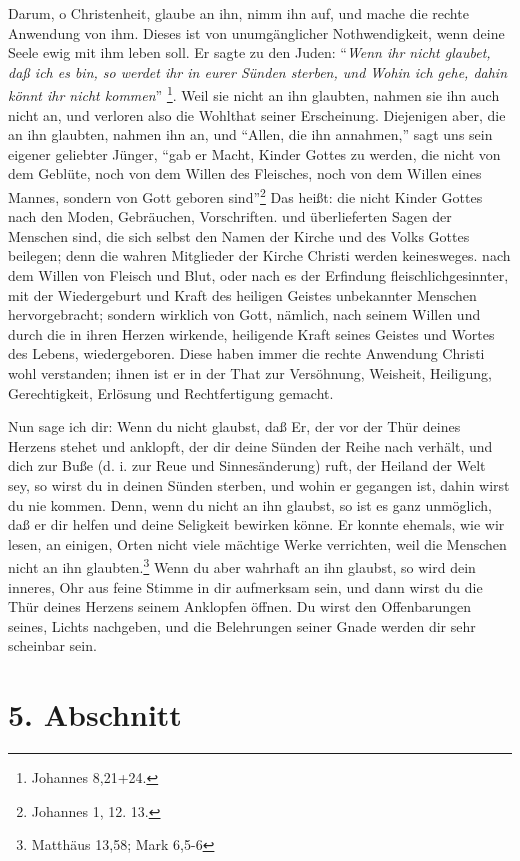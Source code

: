 Darum, o Christenheit, glaube an ihn, nimm ihn auf, und mache die rechte
Anwendung von ihm. Dieses ist von unumgänglicher Nothwendigkeit, wenn deine
Seele ewig mit ihm leben soll.
Er sagte zu den Juden: "`\textit{Wenn ihr nicht glaubet,
daß ich es bin, so werdet ihr in eurer Sünden sterben, und Wohin ich gehe, dahin
könnt ihr nicht kommen}"' \footnote{Johannes 8,21+24.}.
Weil sie nicht an ihn
glaubten, nahmen sie ihn auch nicht an, und verloren also die Wohlthat seiner
Erscheinung. Diejenigen aber, die an ihn glaubten, nahmen ihn an, und "`Allen,
die ihn annahmen,"' sagt uns sein eigener geliebter Jünger, "`gab er Macht,
Kinder Gottes zu werden, die nicht von dem Geblüte, noch von dem Willen des
Fleisches, noch von dem Willen eines Mannes, sondern von Gott geboren
sind"'\footnote{Johannes 1, 12. 13.}  Das heißt: die nicht Kinder Gottes nach den
Moden, Gebräuchen, Vorschriften. und überlieferten Sagen der Menschen sind, die
sich selbst den Namen der Kirche und des Volks Gottes beilegen; denn die wahren
Mitglieder der Kirche Christi werden keinesweges. nach dem Willen von Fleisch
und Blut, oder nach es der Erfindung fleischlichgesinnter, mit der Wiedergeburt
und Kraft des heiligen Geistes unbekannter Menschen hervorgebracht; sondern
wirklich von Gott, nämlich, nach seinem Willen und  durch die in ihren Herzen
wirkende, heiligende Kraft seines Geistes und Wortes des Lebens, wiedergeboren.
Diese haben immer die rechte Anwendung Christi wohl verstanden; ihnen ist er in
der That zur Versöhnung, Weisheit, Heiligung, Gerechtigkeit, Erlösung und
Rechtfertigung gemacht.

Nun sage ich dir: Wenn du nicht glaubst, daß Er, der vor der Thür deines Herzens
stehet und anklopft, der dir deine Sünden der Reihe nach verhält, und dich zur
Buße (d. i. zur Reue und Sinnesänderung) ruft, der Heiland der Welt sey, so
wirst du in deinen Sünden sterben, und wohin er gegangen ist, dahin wirst du nie
kommen. Denn, wenn du nicht an ihn glaubst, so ist es ganz unmöglich, daß er dir
helfen und deine Seligkeit bewirken könne. Er konnte ehemals, wie wir lesen, an
einigen, Orten nicht viele mächtige Werke verrichten, weil die Menschen nicht an
ihn glaubten.\footnote{Matthäus 13,58; Mark 6,5-6} Wenn du aber wahrhaft an ihn
glaubst, so wird dein inneres, Ohr aus feine Stimme in dir aufmerksam sein, und
dann wirst du die Thür deines Herzens seinem Anklopfen öffnen. Du wirst den
Offenbarungen seines, Lichts nachgeben, und die Belehrungen seiner Gnade werden
dir sehr scheinbar sein.

\section{5. Abschnitt}

